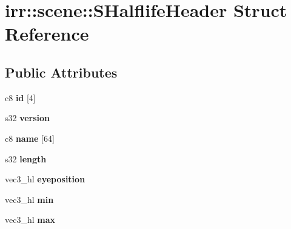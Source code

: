 \hypertarget{structirr_1_1scene_1_1_s_halflife_header}{\section{irr\-:\-:scene\-:\-:S\-Halflife\-Header Struct Reference}
\label{structirr_1_1scene_1_1_s_halflife_header}
}
\subsection*{Public Attributes}
\begin{DoxyCompactItemize}
\item 
\hypertarget{structirr_1_1scene_1_1_s_halflife_header_af6cbee31c99a929d0956c46643da2ca9}{c8 {\bfseries id} \mbox{[}4\mbox{]}}\label{structirr_1_1scene_1_1_s_halflife_header_af6cbee31c99a929d0956c46643da2ca9}

\item 
\hypertarget{structirr_1_1scene_1_1_s_halflife_header_a95e2f455742ded0c4a2a2396266918f2}{s32 {\bfseries version}}\label{structirr_1_1scene_1_1_s_halflife_header_a95e2f455742ded0c4a2a2396266918f2}

\item 
\hypertarget{structirr_1_1scene_1_1_s_halflife_header_ae86af3c74c53a4402a6f67711d277efe}{c8 {\bfseries name} \mbox{[}64\mbox{]}}\label{structirr_1_1scene_1_1_s_halflife_header_ae86af3c74c53a4402a6f67711d277efe}

\item 
\hypertarget{structirr_1_1scene_1_1_s_halflife_header_a07b6bd4d7b84f951c233d6f49860293e}{s32 {\bfseries length}}\label{structirr_1_1scene_1_1_s_halflife_header_a07b6bd4d7b84f951c233d6f49860293e}

\item 
\hypertarget{structirr_1_1scene_1_1_s_halflife_header_a77760e037580e8659eca7b18d69ea8eb}{vec3\-\_\-hl {\bfseries eyeposition}}\label{structirr_1_1scene_1_1_s_halflife_header_a77760e037580e8659eca7b18d69ea8eb}

\item 
\hypertarget{structirr_1_1scene_1_1_s_halflife_header_aead2f6ae40c625b0a03818ee69d202d6}{vec3\-\_\-hl {\bfseries min}}\label{structirr_1_1scene_1_1_s_halflife_header_aead2f6ae40c625b0a03818ee69d202d6}

\item 
\hypertarget{structirr_1_1scene_1_1_s_halflife_header_a14eb0dc034f83c3d2f91dcf2730b095c}{vec3\-\_\-hl {\bfseries max}}\label{structirr_1_1scene_1_1_s_halflife_header_a14eb0dc034f83c3d2f91dcf2730b095c}


\end{DoxyCompactItemize}
